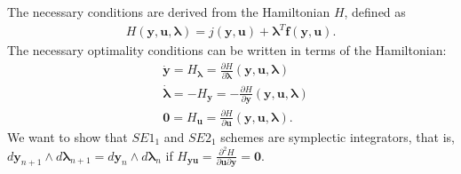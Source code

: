 \documentclass[a4paper, 10pt]{article}
\newcommand{\SEoo}{SE1_1}
\newcommand{\SEto}{SE2_1}
\begin{document}
The necessary conditions are derived from the Hamiltonian $H$, defined as
\begin{align}
    H(\bm{y},\bm{u},\bm{\lambda}) = j(\bm{y},\bm{u}) + \bm{\lambda}^{T}\bm{f}(\bm{y},\bm{u}).
\end{align}
The necessary optimality conditions can be written in terms of the Hamiltonian:
\begin{align}
    & \dot{\bm{y}} = H_{\bm{\lambda}}  = \frac{\partial H}{\partial \bm{\lambda}}(\bm{y},\bm{u},\bm{\lambda})\\
    & \dot{\bm{\lambda}} = -H_{\bm{y}} = - \frac{\partial H}{\partial \bm{y}}(\bm{y},\bm{u},\bm{\lambda})  \\
    & \bm{0} = H_{\bm{u}}= \frac{\partial H}{\partial \bm{u}}(\bm{y},\bm{u},\bm{\lambda}). \label{eq_40}
\end{align}
We want to show that $\SEoo$ and $\SEto$ schemes are symplectic integrators, that is, $d\bm{y}_{n+1} \wedge d\bm{\lambda}_{n+1} = d\bm{y}_{n} \wedge d\bm{\lambda}_{n}$ if $H_{\bm{yu}} = \frac{\partial^{2}H}{\partial \bm{u}\partial\bm{y}} = \bm{0}$.
\end{document}
